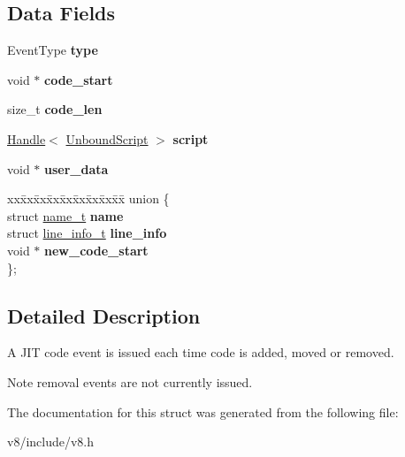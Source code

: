 \subsection*{Data Fields}
\begin{DoxyCompactItemize}
\item 
\hypertarget{structv8_1_1JitCodeEvent_ace1fbc4119ac3ef609d8e0f89cbc2c9f}{}Event\+Type {\bfseries type}\label{structv8_1_1JitCodeEvent_ace1fbc4119ac3ef609d8e0f89cbc2c9f}

\item 
\hypertarget{structv8_1_1JitCodeEvent_aeeac614e6c125bf08bf785b070090d0f}{}void $\ast$ {\bfseries code\+\_\+start}\label{structv8_1_1JitCodeEvent_aeeac614e6c125bf08bf785b070090d0f}

\item 
\hypertarget{structv8_1_1JitCodeEvent_ad56f78749d03f5db29ed417c2f3b4666}{}size\+\_\+t {\bfseries code\+\_\+len}\label{structv8_1_1JitCodeEvent_ad56f78749d03f5db29ed417c2f3b4666}

\item 
\hypertarget{structv8_1_1JitCodeEvent_a7c42ba82323ed1e91c5ef3f181c96d1e}{}\hyperlink{classv8_1_1Handle}{Handle}$<$ \hyperlink{classv8_1_1UnboundScript}{Unbound\+Script} $>$ {\bfseries script}\label{structv8_1_1JitCodeEvent_a7c42ba82323ed1e91c5ef3f181c96d1e}

\item 
\hypertarget{structv8_1_1JitCodeEvent_a90597e06440ebd68fe582bd1361d6de6}{}void $\ast$ {\bfseries user\+\_\+data}\label{structv8_1_1JitCodeEvent_a90597e06440ebd68fe582bd1361d6de6}

\item 
\hypertarget{structv8_1_1JitCodeEvent_af7964de4fa0dd0e4cf77749493ab606c}{}\begin{tabbing}
xx\=xx\=xx\=xx\=xx\=xx\=xx\=xx\=xx\=\kill
union \{\\
\>struct \hyperlink{structv8_1_1JitCodeEvent_1_1name__t}{name\_t} {\bfseries name}\\
\>struct \hyperlink{structv8_1_1JitCodeEvent_1_1line__info__t}{line\_info\_t} {\bfseries line\_info}\\
\>void $\ast$ {\bfseries new\_code\_start}\\
\}; \label{structv8_1_1JitCodeEvent_af7964de4fa0dd0e4cf77749493ab606c}
\\

\end{tabbing}\end{DoxyCompactItemize}


\subsection{Detailed Description}
A J\+I\+T code event is issued each time code is added, moved or removed.

\begin{DoxyNote}{Note}
removal events are not currently issued. 
\end{DoxyNote}


The documentation for this struct was generated from the following file\+:\begin{DoxyCompactItemize}
\item 
v8/include/v8.\+h\end{DoxyCompactItemize}
